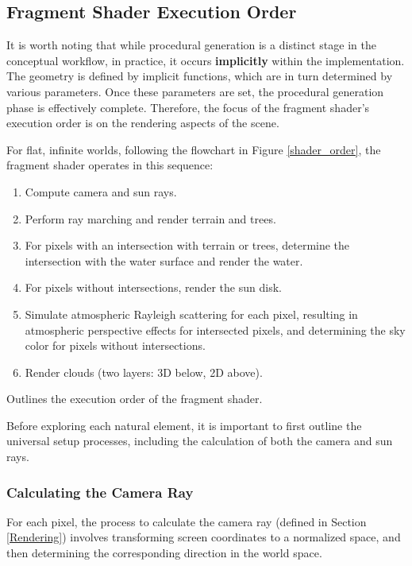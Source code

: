 
\subsection{Fragment Shader Execution Order}

It is worth noting that while procedural generation is a distinct stage in the conceptual workflow, in practice, it occurs \textbf{implicitly} within the implementation. The geometry is defined by implicit functions, which are in turn determined by various parameters. Once these parameters are set, the procedural generation phase is effectively complete. Therefore, the focus of the fragment shader’s execution order is on the rendering aspects of the scene.

For flat, infinite worlds, following the flowchart in Figure \ref{shader_order}, the fragment shader operates in this sequence:
\begin{enumerate}
    \item Compute camera and sun rays.
    \item Perform ray marching and render terrain and trees.
    \item For pixels with an intersection with terrain or trees, determine the intersection with the water surface and render the water.
    \item For pixels without intersections, render the sun disk.
    \item Simulate atmospheric Rayleigh scattering for each pixel, resulting in atmospheric perspective effects for intersected pixels, and determining the sky color for pixels without intersections.
    \item Render clouds (two layers: 3D below, 2D above).
\end{enumerate}

{Outlines the execution order of the fragment shader.}

Before exploring each natural element, it is important to first outline the universal setup processes, including the calculation of both the camera and sun rays.

\subsubsection{Calculating the Camera Ray}

For each pixel, the process to calculate the camera ray (defined in Section \ref{Rendering}) involves transforming screen coordinates to a normalized space, and then determining the corresponding direction in the world space.

